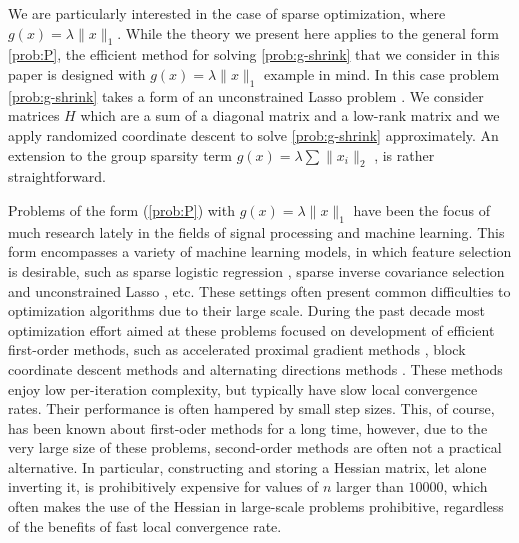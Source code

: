 \documentclass[11pt]{article}
\numberwithin{equation}{section}
\begin{document}
We are particularly interested in the  case of sparse optimization, where $g(x)=\lambda \|x\|_1$.
While the theory we present here applies to the general form \eqref{prob:P},  the efficient method for solving \eqref{prob:g-shrink} that we consider in this paper is designed with $g(x)=\lambda \|x\|_1$ example in mind.  In this case problem \eqref{prob:g-shrink} takes a form of an unconstrained Lasso problem \cite{Tibshirani_1996}. 
We consider matrices $H$ which are a sum of a diagonal matrix and a low-rank matrix and we  apply randomized coordinate descent to solve \eqref{prob:g-shrink} approximately. An extension to the group sparsity term $g(x)=\lambda\sum \|x_i\|_2$ \cite{Qin2010}, is rather straightforward.

Problems of the form (\ref{prob:P}) with $g(x)=\lambda \|x\|_1$ have been the focus of much research lately in the fields of signal processing and machine learning. This form encompasses a variety of machine learning models, 
in which feature selection is desirable, such as sparse logistic regression \cite{Yuan2010,nGLMNET,shalev2009stochastic}, sparse inverse covariance selection \cite{Hsieh2011,Olsen2012,Sinco2009} and unconstrained Lasso \cite{Tibshirani_1996}, etc. These settings often present common difficulties to optimization algorithms due to their large scale. During the past decade most optimization effort aimed at these problems focused on development of efficient first-order methods, such as accelerated proximal gradient methods \cite{Nesterov,Beck2009,Sparsa}, block coordinate descent methods \cite{nGLMNET,GLMNET,glasso_2008,Sinco2009} and alternating directions methods \cite{Alm_Scheinberg}. These methods enjoy low per-iteration complexity, but typically have slow local convergence rates. Their performance is often hampered by small step sizes. This, of course, has been known about first-oder methods for a long time, however, due to the very large size of these problems, second-order methods are often not a practical alternative.
In particular, constructing and storing a Hessian matrix, let alone inverting it, is prohibitively expensive for values of $n$ larger than $10000$, which often makes the use of the Hessian in large-scale problems prohibitive, regardless of the benefits of fast local convergence rate. 
\end{document}
